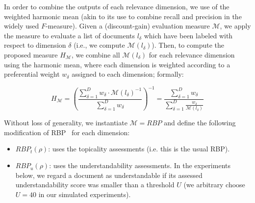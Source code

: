 In order to combine the outputs of each relevance dimension, we use of the weighted harmonic mean (akin to its use to combine recall and precision in the widely used $F$-measure). Given a (discount-gain) evaluation measure $\mathcal{M}$, we apply the measure to evaluate a list of  documents $l_\delta$ which have been labeled with respect to dimension $\delta$ (i.e., we compute $\mathcal{M}(l_\delta)$). Then, to compute the proposed measure $H_\mathcal{M}$, we combine all $\mathcal{M}(l_\delta)$ for each relevance dimension using the harmonic mean, where each dimension is weighted according to a preferential weight $w_\delta$ assigned to each dimension; formally:


\begin{equation}
    H_\mathcal{M}  = \left( \frac{\sum\limits_{\delta=1}^D w_\delta \cdot \mathcal{M}(l_\delta)^{-1}}{\sum\limits_{\delta=1}^D w_\delta} \right)^{-1}
          = \frac{\sum\limits_{\delta=1}^D w_\delta}{\sum\limits_{\delta=1}^D \frac{w_\delta}{\mathcal{M}(l_\delta)}}
\label{eq:H}
\end{equation}

%
%
%


%
Without loss of generality, we instantiate $\mathcal{M} = RBP$ and define the following modification of RBP~\cite{moffat08} for each dimension:
%
\begin{itemize}[leftmargin=*]
	\item $RBP_t(\rho)$: uses the topicality assessments (i.e. this is the usual RBP). 
%	
    \item $RBP_u(\rho)$: uses the understandability assessments. In the experiments below, we regard a document as understandable if its assessed understandability score was smaller than a threshold $U$ (we arbitrary choose $U = 40$ in our simulated experiments).
\end{itemize}


